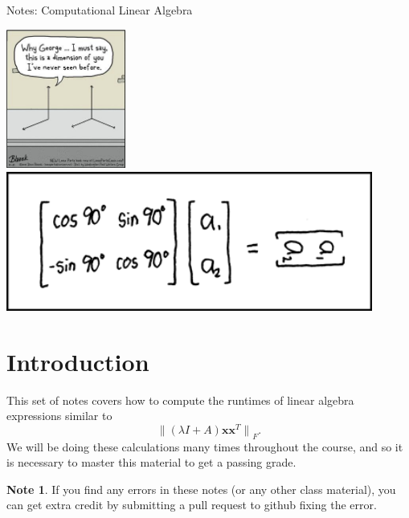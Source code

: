 \documentclass[10pt]{article}
\theoremstyle{definition}
\newtheorem{note}{Note}
\newcommand{\trans}[1]{{#1}^{T}}
\newcommand{\x}{\mathbf x}
\newcommand{\lF}[1]{{\lVert {#1} \rVert}_F}
\begin{document}
\begin{center}
{
\Huge
Notes: Computational Linear Algebra
}

\vspace{0.15in}
\end{center}

\begin{center}
\includegraphics[height=1.8in]{comic}
\includegraphics[height=1.8in]{matrix_transform}
\end{center}


\section{Introduction}

This set of notes covers how to compute the runtimes of linear algebra expressions similar to
\begin{equation}
\lF{(\lambda I + A) \x \trans \x}
.
\end{equation}
We will be doing these calculations many times throughout the course,
and so it is necessary to master this material to get a passing grade.

\begin{note}
If you find any errors in these notes (or any other class material),
you can get extra credit by submitting a pull request to github fixing the error.
\end{note}

\end{document}
